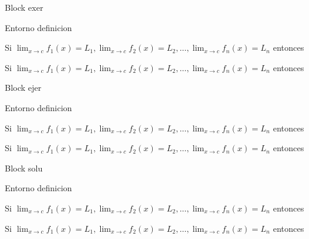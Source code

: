 \documentclass[]{beamer}
\theoremstyle{plain}
\begin{document}
\begin{frame}[fragile]{Block exer}
\begin{source}{Entorno definicion}{}
\begin{exer}
 Si \hspace{5pt}$\displaystyle \lim_{x\rightarrow c}f_1(x)=L_1, \displaystyle \lim_{x\rightarrow c}f_2(x)=L_2,\dots, \displaystyle \lim_{x\rightarrow c}f_n(x)=L_n $
 entonces
\end{exer}
\end{source}
\begin{exer}
 Si \hspace{5pt}$\displaystyle \lim_{x\rightarrow c}f_1(x)=L_1, \displaystyle \lim_{x\rightarrow c}f_2(x)=L_2,\dots, \displaystyle \lim_{x\rightarrow c}f_n(x)=L_n $
 entonces
\end{exer}
\end{frame}
\begin{frame}[fragile]{Block ejer}
\begin{source}{Entorno definicion}{}
\begin{ejer}
 Si \hspace{5pt}$\displaystyle \lim_{x\rightarrow c}f_1(x)=L_1, \displaystyle \lim_{x\rightarrow c}f_2(x)=L_2,\dots, \displaystyle \lim_{x\rightarrow c}f_n(x)=L_n $
 entonces
\end{ejer}
\end{source}
\begin{ejer}
 Si \hspace{5pt}$\displaystyle \lim_{x\rightarrow c}f_1(x)=L_1, \displaystyle \lim_{x\rightarrow c}f_2(x)=L_2,\dots, \displaystyle \lim_{x\rightarrow c}f_n(x)=L_n $
 entonces
\end{ejer}
\end{frame}
\begin{frame}[fragile]{Block solu}
\begin{source}{Entorno definicion}{}
\begin{solu}
 Si \hspace{5pt}$\displaystyle \lim_{x\rightarrow c}f_1(x)=L_1, \displaystyle \lim_{x\rightarrow c}f_2(x)=L_2,\dots, \displaystyle \lim_{x\rightarrow c}f_n(x)=L_n $
 entonces
\end{solu}
\end{source}
\begin{solu}
 Si \hspace{5pt}$\displaystyle \lim_{x\rightarrow c}f_1(x)=L_1, \displaystyle \lim_{x\rightarrow c}f_2(x)=L_2,\dots, \displaystyle \lim_{x\rightarrow c}f_n(x)=L_n $
 entonces
\end{solu}
\end{frame}
\end{document}
